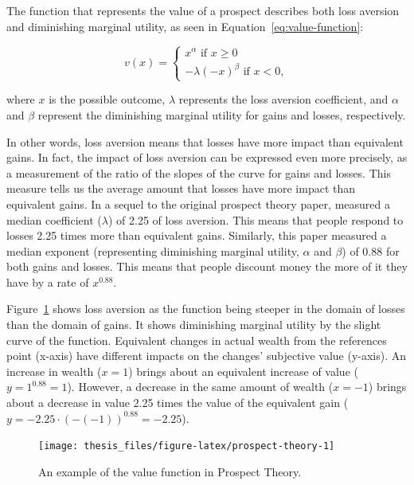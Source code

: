 \documentclass[a4paper, nobind, dvipsnames]{templates/ociamthesis}
\theoremstyle{definition}
\theoremstyle{definition}
\theoremstyle{definition}
\theoremstyle{definition}
\theoremstyle{remark}
\begin{document}
The function that represents the value of a prospect describes both loss
aversion and diminishing marginal utility, as seen in
Equation~\eqref{eq:value-function}:

\begin{equation}
v(x) = \left\{ \begin{array}{l}
x^\alpha \text{ if } x \ge 0 \\
-\lambda(-x)^\beta \text{ if } x < 0,
\label{eq:value-function}
\end{array} \right.
\end{equation}

where \(x\) is the possible outcome, \(\lambda\) represents the loss aversion
coefficient, and \(\alpha\) and \(\beta\) represent the diminishing marginal utility
for gains and losses, respectively.

In other words, loss aversion means that losses have more impact than equivalent
gains. In fact, the impact of loss aversion can be expressed even more
precisely, as a measurement of the ratio of the slopes of the curve for gains
and losses. This measure tells us the average amount that losses have more
impact than equivalent gains. In a sequel to the original prospect theory paper,
\textcite{tversky1992} measured a median coefficient (\(\lambda\)) of 2.25 of loss aversion.
This means that people respond to losses 2.25 times more than equivalent gains.
Similarly, this paper measured a median exponent (representing diminishing
marginal utility, \(\alpha\) and \(\beta\)) of 0.88 for both gains and losses. This
means that people discount money the more of it they have by a rate of
\(x^{0.88}\).

Figure~\ref{fig:prospect-theory} shows loss aversion as the function being
steeper in the domain of losses than the domain of gains. It shows diminishing
marginal utility by the slight curve of the function. Equivalent changes in
actual wealth from the references point (x-axis) have different impacts on the
changes' subjective value (y-axis). An increase in wealth (\(x = 1\)) brings about
an equivalent increase of value (\(y = 1^{0.88} = 1\)). However, a decrease in the
same amount of wealth (\(x = -1\)) brings about a decrease in value 2.25 times the
value of the equivalent gain (\(y = -2.25 \cdot (-(-1))^{0.88} = -2.25\)).



\begin{figure}
\texttt{[image: thesis\_files/figure-latex/prospect-theory-1]} \caption{An example of the value function in Prospect Theory.}\label{fig:prospect-theory}
\end{figure}
\end{document}

